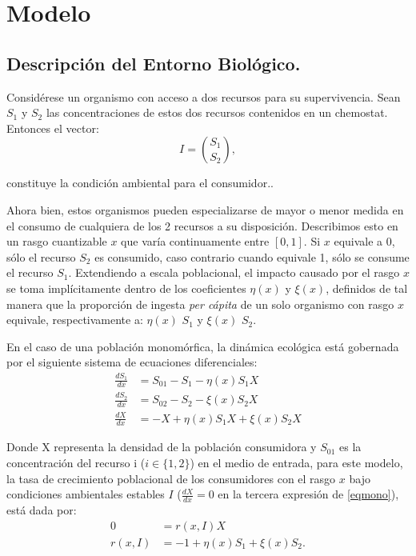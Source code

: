 \section{Modelo}
\subsection{Descripción del Entorno Biológico.}

Considérese un organismo con acceso a dos recursos para su supervivencia. Sean $S_1$ y $S_2$ las concentraciones de estos dos recursos contenidos en un chemostat. Entonces el vector:
\begin{equation}
	I=\binom{S_{1}}{S_{2}},
\end{equation}

constituye la condición ambiental para el consumidor.\citep{Diekmann2001, diekman2003}.

Ahora bien, estos organismos pueden especializarse de mayor o menor medida en el consumo de cualquiera de los 2 recursos a su disposición. Describimos esto en un rasgo cuantizable $x$ que varía continuamente entre $[0,1]$. Si $x$ equivale a 0, sólo el recurso $S_2$ es consumido, caso contrario cuando equivale 1, sólo se consume el recurso $S_1$. Extendiendo a escala poblacional, el impacto causado por el rasgo $x$ se toma implícitamente dentro de los coeficientes $\eta(x)$ y $\xi(x)$, definidos de tal manera que la proporción de ingesta \textit{per cápita} de un solo organismo con rasgo $x$ equivale, respectivamente a: $\eta(x)$ $S_1$ y $\xi(x)$ $S_2$.\citep{dieckman2005}

En el caso de una población monomórfica, la dinámica ecológica está gobernada por el siguiente sistema de ecuaciones diferenciales:
\begin{equation}\label{eqmono}
	\begin{split}
		\frac{d S_1}{dx} & =S_{01}-S_1-\eta(x)S_1X \\  \frac{d S_2}{dx}&=S_{02}-S_2-\xi(x)S_2X\\ \frac{d X}{dx}&=-X+\eta(x)S_1X+\xi(x)S_2X
	\end{split}
\end{equation}

Donde X representa la densidad de la población consumidora y $S_{01}$ es la concentración del recurso i ($i\in\{1,2\}$) en el medio de entrada, para este modelo, la tasa de crecimiento poblacional de los consumidores con el rasgo $x$ bajo condiciones ambientales estables $I$ ($\frac{d X}{dx}=0$ en la tercera expresión de \eqref{eqmono}), está dada por:
\begin{equation}\label{r}
	\begin{split}
		0      & =r(x,I)X                  \\
		r(x,I) & =-1+\eta(x)S_1+\xi(x)S_2.
	\end{split}
\end{equation}

